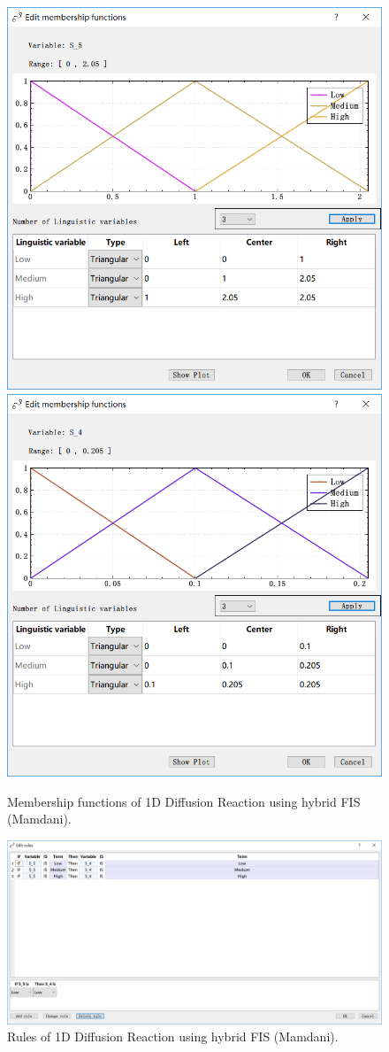 \documentclass[journal,a4paper,onecolumn]{article}
\begin{document}
\begin{figure}[!hbt]
	\begin{center}
		\includegraphics[width=0.45\columnwidth]{fig36}
		\includegraphics[width=0.45\columnwidth]{fig37}
		\caption{Membership functions of 1D Diffusion Reaction using hybrid FIS (Mamdani).}
		\label{fig:Membership functions of 1D Diffusion Reaction using hybrid FIS (Mamdani).}
	\end{center}
\end{figure}
\begin{figure}[!hbt]
	\begin{center}
		\includegraphics[width=\columnwidth]{fig38}
		\caption{Rules of 1D Diffusion Reaction using hybrid FIS (Mamdani).}
		\label{fig:Rules of 1D Diffusion Reaction using hybrid FIS (Mamdani).}
	\end{center}
\end{figure}
\end{document}

